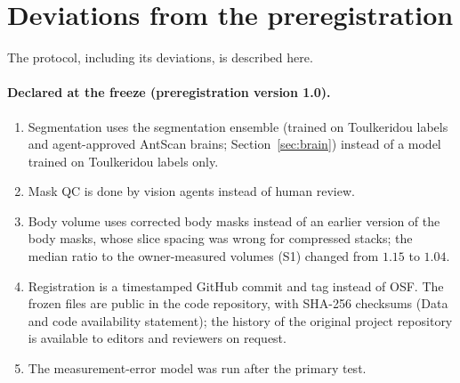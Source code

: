 \section{Deviations from the preregistration}\label{app:dev}

The protocol, including its deviations, is described here.

\paragraph{Declared at the freeze (preregistration version 1.0).}
\begin{enumerate}[series=deviations]
\item\label{dev:seg} Segmentation uses the segmentation ensemble (trained on Toulkeridou labels and agent-approved
AntScan brains; Section~\ref{sec:brain}) instead of a model trained on Toulkeridou labels only.
\item\label{dev:qc} Mask QC is done by vision agents instead of human review.
\item\label{dev:body} Body volume uses corrected body masks instead of an earlier version of the body masks, whose
slice spacing was wrong for compressed stacks; the median ratio to the owner-measured volumes (S1) changed from $1.15$
to $1.04$.
\item\label{dev:reg} Registration is a timestamped GitHub commit and tag instead of OSF. The frozen files are public
in the code repository, with SHA-256 checksums (Data and code availability statement); the history of the original
project repository is available to editors and reviewers on request.
\item\label{dev:metime} The measurement-error model was run after the primary test.
\end{enumerate}

